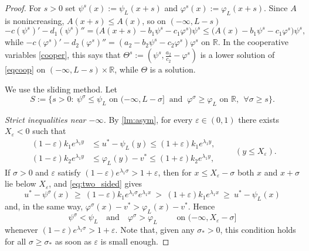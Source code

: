 \documentclass[reqno]{amsart}
\theoremstyle{plain}
\theoremstyle{definition}
\theoremstyle{remark}
\begin{document}
\begin{proof}
	For $s>0$ set $\psi^s(x):=\psi_L(x+s)$ and $\varphi^s(x):=\varphi_L(x+s)$.
	Since $A$ is nonincreasing, $A(x+s)\le A(x)$, so on $(-\infty,L-s)$
	\[
	-c(\psi^{s})' - d_1(\psi^{s})'' = \big(A(x+s)-b_1\psi^{s}-c_1\varphi^{s}\big)\psi^{s}
	\le \big(A(x)-b_1\psi^{s}-c_1\varphi^{s}\big)\psi^{s},
	\]
	while $-c(\varphi^{s})'-d_2(\varphi^{s})''=(a_2-b_2\psi^{s}-c_2\varphi^{s})\varphi^{s}$
	on $\mathbb{R}$. In the cooperative variables \eqref{cooper}, this says that
	$\Theta^{s}:=(\psi^{s},\frac{a_2}{c_2}-\varphi^{s})$ is a lower solution of
	\eqref{eqcoop} on $(-\infty,L-s)\times \mathbb{R}$, while $\Theta$ is a solution.

	We use the sliding method. Let
	\[
	S:=\Big\{s>0:\ \psi^{\sigma}\le\psi_L \text{ on }(-\infty,L-\sigma]\ \text{ and }\
	\varphi^{\sigma}\ge\varphi_L \text{ on }\mathbb{R},\ \ \forall\sigma\ge s\Big\}.
	\]

	\emph{Strict inequalities near $-\infty$.} By \cref{lm:asym}, for every
	$\varepsilon\in(0,1)$ there exists $X_\varepsilon<0$ such that
	\begin{equation}\label{eq:two_sided}
		\begin{aligned}
			(1-\varepsilon)k_1e^{\lambda_1y}&\le u^*-\psi_L(y)\le (1+\varepsilon)k_1e^{\lambda_1y},\\
			(1-\varepsilon)k_2e^{\lambda_1y}&\le \varphi_L(y)-v^*\le (1+\varepsilon)k_2e^{\lambda_1y},
		\end{aligned}
		\qquad (y\le X_\varepsilon).
	\end{equation}
	If $\sigma>0$ and $\varepsilon$ satisfy $(1-\varepsilon)e^{\lambda_1\sigma}>1+\varepsilon$,
	then for $x\le X_\varepsilon-\sigma$ both $x$ and $x+\sigma$ lie below
	$X_\varepsilon$, and \eqref{eq:two_sided} gives
	\[
	u^*-\psi^{\sigma}(x)\ \ge\ (1-\varepsilon)k_1e^{\lambda_1\sigma}e^{\lambda_1x}
	\ >\ (1+\varepsilon)k_1e^{\lambda_1x}\ \ge\ u^*-\psi_L(x)
	\]
	and, in the same way, $\varphi^{\sigma}(x)-v^*>\varphi_L(x)-v^*$. Hence
	\begin{equation}\label{eq:strict_minus}
		\psi^{\sigma}<\psi_L \quad\text{and}\quad \varphi^{\sigma}>\varphi_L
		\qquad\text{ on } (-\infty,X_\varepsilon-\sigma]
	\end{equation}
	whenever $(1-\varepsilon)e^{\lambda_1\sigma}>1+\varepsilon$. Note that, given
	any $\sigma_*>0$, this condition holds for all $\sigma\ge\sigma_*$ as soon as
	$\varepsilon$ is small enough.


\end{proof}
\end{document}
